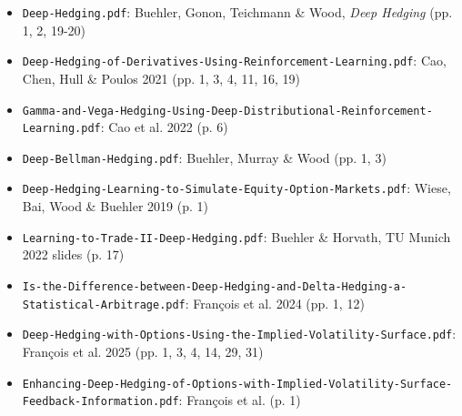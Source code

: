 \documentclass{article}
\begin{document}
\begin{itemize}

\item \texttt{Deep-\allowbreak{}Hedging.\allowbreak{}pdf}: Buehler, Gonon, Teichmann \& Wood, \emph{Deep Hedging} (pp. 1, 2, 19-20)

\item \texttt{Deep-\allowbreak{}Hedging-\allowbreak{}of-\allowbreak{}Derivatives-\allowbreak{}Using-\allowbreak{}Reinforcement-\allowbreak{}Learning.\allowbreak{}pdf}: Cao, Chen, Hull \& Poulos 2021 (pp. 1, 3, 4, 11, 16, 19)

\item \texttt{Gamma-\allowbreak{}and-\allowbreak{}Vega-\allowbreak{}Hedging-\allowbreak{}Using-\allowbreak{}Deep-\allowbreak{}Distributional-\allowbreak{}Reinforcement-\allowbreak{}Learning.\allowbreak{}pdf}: Cao et al. 2022 (p. 6)

\item \texttt{Deep-\allowbreak{}Bellman-\allowbreak{}Hedging.\allowbreak{}pdf}: Buehler, Murray \& Wood (pp. 1, 3)

\item \texttt{Deep-\allowbreak{}Hedging-\allowbreak{}Learning-\allowbreak{}to-\allowbreak{}Simulate-\allowbreak{}Equity-\allowbreak{}Option-\allowbreak{}Markets.\allowbreak{}pdf}: Wiese, Bai, Wood \& Buehler 2019 (p. 1)

\item \texttt{Learning-\allowbreak{}to-\allowbreak{}Trade-\allowbreak{}II-\allowbreak{}Deep-\allowbreak{}Hedging.\allowbreak{}pdf}: Buehler \& Horvath, TU Munich 2022 slides (p. 17)

\item \texttt{Is-\allowbreak{}the-\allowbreak{}Difference-\allowbreak{}between-\allowbreak{}Deep-\allowbreak{}Hedging-\allowbreak{}and-\allowbreak{}Delta-\allowbreak{}Hedging-\allowbreak{}a-\allowbreak{}Statistical-\allowbreak{}Arbitrage.\allowbreak{}pdf}: François et al. 2024 (pp. 1, 12)

\item \texttt{Deep-\allowbreak{}Hedging-\allowbreak{}with-\allowbreak{}Options-\allowbreak{}Using-\allowbreak{}the-\allowbreak{}Implied-\allowbreak{}Volatility-\allowbreak{}Surface.\allowbreak{}pdf}: François et al. 2025 (pp. 1, 3, 4, 14, 29, 31)

\item \texttt{Enhancing-\allowbreak{}Deep-\allowbreak{}Hedging-\allowbreak{}of-\allowbreak{}Options-\allowbreak{}with-\allowbreak{}Implied-\allowbreak{}Volatility-\allowbreak{}Surface-\allowbreak{}Feedback-\allowbreak{}Information.\allowbreak{}pdf}: François et al. (p. 1)


\end{itemize}
\end{document}
